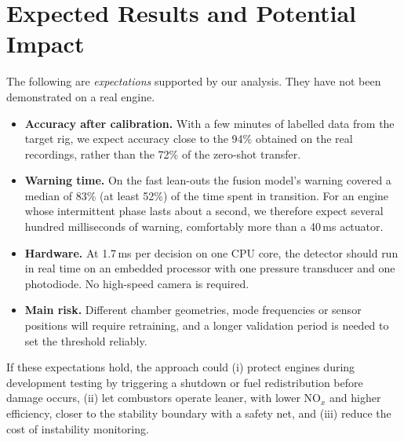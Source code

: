 \documentclass[11pt,a4paper]{article}
\begin{document}
\section{Expected Results and Potential Impact}\label{sec:expected}
The following are \emph{expectations} supported by our analysis. They have not been demonstrated on a real engine.
\begin{itemize}
  \item \textbf{Accuracy after calibration.} With a few minutes of labelled data from the target rig, we expect accuracy close to the 94\% obtained on the real recordings, rather than the 72\% of the zero-shot transfer.
  \item \textbf{Warning time.} On the fast lean-outs the fusion model's warning covered a median of 83\% (at least 52\%) of the time spent in transition. For an engine whose intermittent phase lasts about a second, we therefore expect several hundred milliseconds of warning, comfortably more than a 40\,ms actuator.
  \item \textbf{Hardware.} At 1.7\,ms per decision on one CPU core, the detector should run in real time on an embedded processor with one pressure transducer and one photodiode. No high-speed camera is required.
  \item \textbf{Main risk.} Different chamber geometries, mode frequencies or sensor positions will require retraining, and a longer validation period is needed to set the threshold reliably.
\end{itemize}
If these expectations hold, the approach could (i) protect engines during development testing by triggering a shutdown or fuel redistribution before damage occurs, (ii) let combustors operate leaner, with lower NO$_x$ and higher efficiency, closer to the stability boundary with a safety net, and (iii) reduce the cost of instability monitoring.

\end{document}

